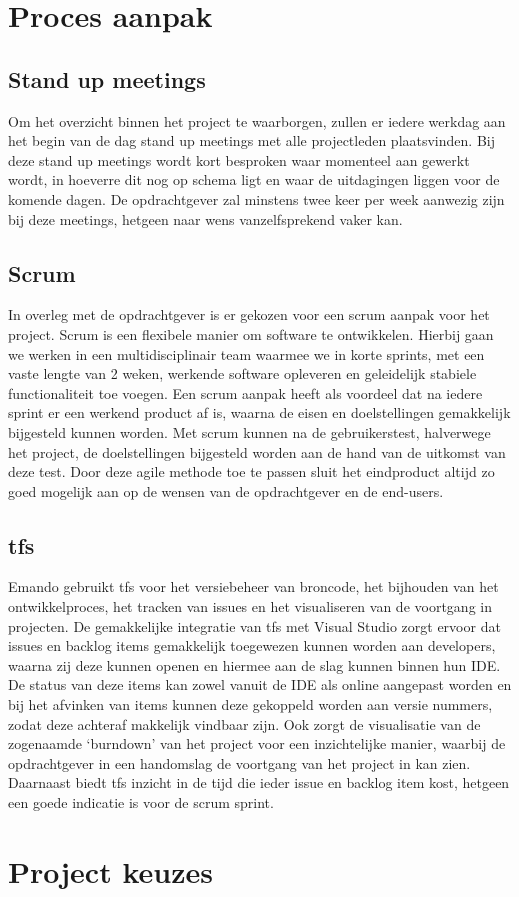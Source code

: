 \section{Proces aanpak}

\subsection{Stand up meetings}
Om het overzicht binnen het project te waarborgen, zullen er iedere werkdag aan het begin van de dag stand up meetings met alle projectleden plaatsvinden. Bij deze stand up meetings wordt kort besproken waar momenteel aan gewerkt wordt, in hoeverre dit nog op schema ligt en waar de uitdagingen liggen voor de komende dagen. De opdrachtgever zal minstens twee keer per week aanwezig zijn bij deze meetings, hetgeen naar wens vanzelfsprekend vaker kan.

\subsection{Scrum}
In overleg met de opdrachtgever is er gekozen voor een scrum aanpak voor het project. Scrum is een flexibele manier om software te ontwikkelen. Hierbij gaan we werken in een multidisciplinair team waarmee we in korte sprints, met een vaste lengte van 2 weken, werkende software opleveren en geleidelijk stabiele functionaliteit toe voegen. Een scrum aanpak heeft als voordeel dat na iedere sprint er een werkend product af is, waarna de eisen en doelstellingen gemakkelijk bijgesteld kunnen worden. Met scrum kunnen na de gebruikerstest, halverwege het project, de doelstellingen bijgesteld worden aan de hand van de uitkomst van deze test. Door deze agile methode toe te passen sluit het eindproduct altijd zo goed mogelijk aan op de wensen van de opdrachtgever en de end-users.

\subsection{\acl{tfs}}
Emando gebruikt \ac{tfs} voor het versiebeheer van broncode, het bijhouden van het ontwikkelproces, het tracken van issues en het visualiseren van de voortgang in projecten. De gemakkelijke integratie van \ac{tfs} met Visual Studio zorgt ervoor dat issues en backlog items gemakkelijk toegewezen kunnen worden aan developers, waarna zij deze kunnen openen en hiermee aan de slag kunnen binnen hun IDE. De status van deze items kan zowel vanuit de IDE als online aangepast worden en bij het afvinken van items kunnen deze gekoppeld worden aan versie nummers, zodat deze achteraf makkelijk vindbaar zijn.
Ook zorgt de visualisatie van de zogenaamde ‘burndown’ van het project voor een inzichtelijke manier, waarbij de opdrachtgever in een handomslag de voortgang van het project in kan zien. Daarnaast biedt \ac{tfs} inzicht in de tijd die ieder issue en backlog item kost, hetgeen een goede indicatie is voor de scrum sprint.

\section{Project keuzes}



